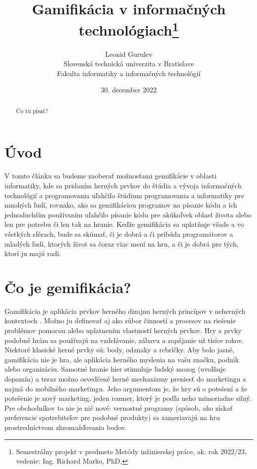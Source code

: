 \documentclass[14pt,twoside,a4paper]{article}
\title{Gamifikácia v informačných technológiach\thanks{Semestrálny projekt v predmete Metódy inžinierskej práce, ak. rok 2022/23, vedenie: Ing. Richard Marko, PhD.}}
\author{Leonid Gurulev\\[2pt]
	{\small Slovenská technická univerzita v Bratislave}\\
	{\small Fakulta informatiky a informačných technológií}\\
	{\small \text{qgurulev@stuba.sk}}
	}
\date{\small 30. december 2022}
\begin{document}
\maketitle
\begin{abstract}
Co tu pisat?
\end{abstract}

\section{Úvod}
V tomto článku sa budeme zaoberať možnosťami gemifikácie v oblasti informatiky, 
kde sa pridaním herných prvkov do štúdia a vývoja informačných technológií 
a programovania uľahčilo štúdium programovania a informatiky pre mnohých ľudí, 
rovnako, ako sa gemifikáciou programov na písanie kódu 
a ich jednoduchším používaním uľahčilo písanie kódu pre 
akúkoľvek oblasť života alebo len pre potrebu 
či len tak na hranie. 
Keďže gemifikácia sa uplatňuje všade a vo všetkých sférach, 
bude sa skúmať, či je dobrá a či pribúda programátorov 
a mladých ľudí, ktorých život sa čoraz viac mení na hru, 
a či je dobrá pre tých, ktorí ju majú radi.




\section{Čo je gemifikácia?}

Gamifikácia je aplikácia prvkov herného dizajnu 
herných princípov v neherných kontextoch \cite{8166715}.
Možno ju definovať aj ako súbor činností a procesov na riešenie problémov pomocou alebo uplatnením vlastností herných prvkov\cite{gamify}.
Hry a prvky podobné hrám sa používajú na vzdelávanie, zábavu a zapájanie už tisíce rokov. Niektoré klasické herné prvky sú: body, odznaky a rebríčky.
Aby bolo jasné, gamifikácia nie je hra, ale aplikácia herného myslenia na vašu značku, podnik alebo organizáciu. Samotné hranie hier stimuluje ľudský mozog (uvoľňuje dopamín) a teraz možno osvedčené herné mechanizmy preniesť do marketingu a najmä do mobilného marketingu. Jeho argumentom je, že hry sú o potešení a že potešenie je nový marketing, jeden rozmer, ktorý je podľa neho mimoriadne silný.
Pre obchodníkov to nie je nič nové: vernostné programy (spôsob, ako získať preferencie spotrebiteľov pre podobné produkty) sa zameriavajú na hru prostredníctvom zhromažďovania bodov\cite{smarting}.
\end{document}
